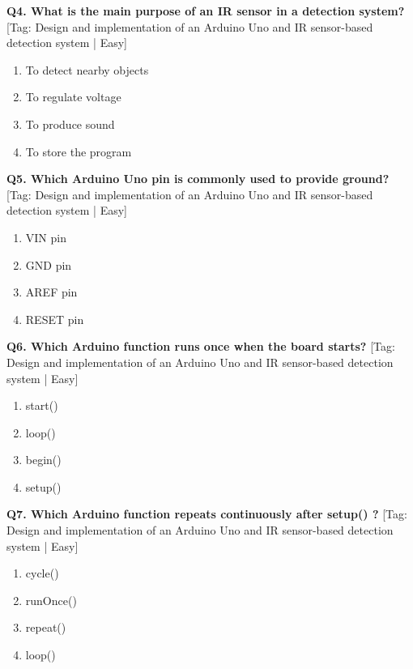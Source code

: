 \noindent\textbf{Q4. What is the main purpose of an IR sensor in a detection system?} \hfill [Tag: Design and implementation of an Arduino Uno and IR sensor-based detection system | Easy]
\begin{enumerate}[label=(\alph*),topsep=2pt,itemsep=1pt,partopsep=0pt,parsep=0pt]
    \item {To detect nearby objects}
    \item {To regulate voltage}
    \item {To produce sound}
    \item {To store the program}
\end{enumerate}
\vspace{2mm}

\noindent\textbf{Q5. Which Arduino Uno pin is commonly used to provide ground?} \hfill [Tag: Design and implementation of an Arduino Uno and IR sensor-based detection system | Easy]
\begin{enumerate}[label=(\alph*),topsep=2pt,itemsep=1pt,partopsep=0pt,parsep=0pt]
    \item {VIN pin}
    \item {GND pin}
    \item {AREF pin}
    \item {RESET pin}
\end{enumerate}
\vspace{2mm}

\noindent\textbf{Q6. Which Arduino function runs once when the board starts?} \hfill [Tag: Design and implementation of an Arduino Uno and IR sensor-based detection system | Easy]
\begin{enumerate}[label=(\alph*),topsep=2pt,itemsep=1pt,partopsep=0pt,parsep=0pt]
    \item {start()}
    \item {loop()}
    \item {begin()}
    \item {setup()}
\end{enumerate}
\vspace{2mm}

\noindent\textbf{Q7. Which Arduino function repeats continuously after setup() ?} \hfill [Tag: Design and implementation of an Arduino Uno and IR sensor-based detection system | Easy]
\begin{enumerate}[label=(\alph*),topsep=2pt,itemsep=1pt,partopsep=0pt,parsep=0pt]
    \item {cycle()}
    \item {runOnce()}
    \item {repeat()}
    \item {loop()}
\end{enumerate}
\vspace{2mm}

